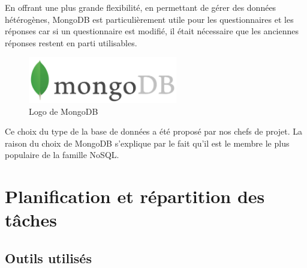 En offrant une plus grande flexibilité, en permettant de gérer des données hétérogènes, MongoDB est particulièrement utile pour les questionnaires et les réponses car si un questionnaire est modifié, il était nécessaire que les anciennes réponses restent en parti utilisables.

\begin{figure}[H]
    \begin{center}
    \includegraphics[height=2.0cm]{img/mongodb}
    \end{center}
    \caption{Logo de MongoDB}
\end{figure}

Ce choix du type de la base de données a été proposé par nos chefs de projet. La raison du choix de MongoDB s'explique par le fait qu'il est le membre le plus populaire de la famille NoSQL.   

\section{Planification et répartition des tâches}

\subsection{Outils utilisés}

